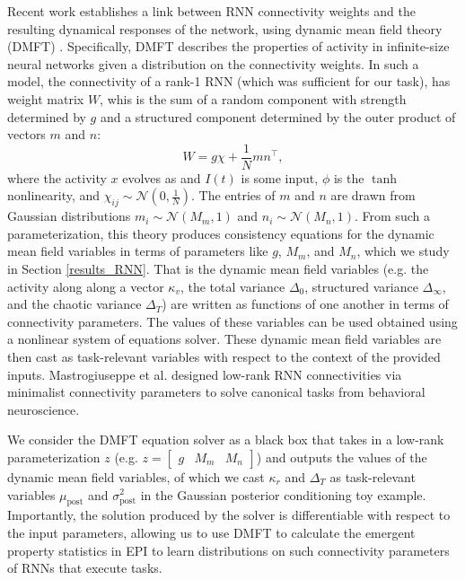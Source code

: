 \documentclass[11pt]{article}
\begin{document}
Recent work establishes a link between RNN connectivity weights and the resulting dynamical responses of the network, using dynamic mean field theory (DMFT) \cite{mastrogiuseppe2018linking}.
Specifically, DMFT describes the properties of activity in infinite-size neural networks given a distribution on the connectivity weights.
In such a model, the connectivity of a rank-1 RNN (which was sufficient for our task), has weight matrix $W$, whis is the sum of a random component with strength determined by $g$ and a structured component determined by the outer product of vectors $m$ and $n$:
\begin{equation}
W = g\chi + \frac{1}{N}mn^\top,
\end{equation}
where the activity $x$ evolves as
and $I(t)$ is some input, $\phi$ is the $\tanh$ nonlinearity, and  $\chi_{ij} \sim \mathcal{N}(0, \frac{1}{N})$.  
The entries of $m$ and $n$ are drawn from Gaussian distributions $m_i \sim \mathcal{N}(M_m, 1)$ and $n_i \sim \mathcal{N}(M_n, 1)$. From such a parameterization, this theory produces consistency equations for the dynamic mean field variables in terms of parameters like $g$, $M_m$, and $M_n$, which we study in Section \ref{results_RNN}.  That is the dynamic mean field variables (e.g. the activity along along a vector $\kappa_v$, the total variance $\Delta_0$, structured variance $\Delta_\infty$, and the chaotic variance $\Delta_T$) are written as functions of one another in terms of connectivity parameters.  The values of these variables can be used obtained using a nonlinear system of equations solver.  These dynamic mean field variables are then cast as task-relevant variables with respect to the context of the provided inputs. Mastrogiuseppe et al. designed low-rank RNN connectivities via minimalist connectivity parameters to solve canonical tasks from behavioral neuroscience. 

We consider the DMFT equation solver as a black box that takes in a low-rank parameterization $z$ (e.g. $z = \begin{bmatrix} g & M_m & M_n \end{bmatrix}$)  and outputs the values of the dynamic mean field variables, of which we cast $\kappa_r$ and $\Delta_T$ as task-relevant variables $\mu_{\text{post}}$ and $\sigma^2_{\text{post}}$ in the Gaussian posterior conditioning toy example.
Importantly, the solution produced by the solver is differentiable with respect to the input parameters, allowing us to use DMFT to calculate the emergent property statistics in EPI to learn distributions on such connectivity parameters of RNNs that execute tasks.
\end{document}
